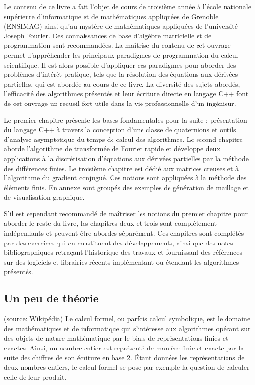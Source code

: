 Le contenu de ce livre a fait l'objet de cours de troisième année à l'école nationale supérieure d'informatique et de mathématiques appliquées de Grenoble (ENSIMAG) ainsi qu'au mystère de mathématiques appliquées de l'université Joseph Fourier. Des connaissances de base d'algèbre matricielle et de programmation sont recommandées. La maîtrise du contenu de cet ouvrage permet d'appréhender les principaux paradigmes de programmation du calcul scientifique. Il est alors possible d'appliquer ces paradigmes pour aborder des problèmes d'intérêt pratique, tels que la résolution des équations aux dérivées partielles, qui est abordée au cours de ce livre. La diversité des sujets abordés, l'efficacité des algorithmes présentés et leur écriture directe en langage C++ font de cet ouvrage un recueil fort utile dans la vie professionnelle d'un ingénieur. 

Le premier chapitre présente les bases fondamentales pour la suite : présentation du langage C++ à travers la conception d'une classe de quaternions et outils d'analyse asymptotique du temps de calcul des algorithmes. Le second chapitre aborde l'algorithme de transformée de Fourier rapide et développe deux applications à la discrétisation d'équations aux dérivées partielles par la méthode des différences finies. Le troisième chapitre est dédié aux matrices creuses et à l'algorithme du gradient conjugué. Ces notions sont appliquées à la méthode des éléments finis. En annexe sont groupés des exemples de génération de maillage et de visualisation graphique. 

S'il est cependant recommandé de maîtriser les notions du premier chapitre pour aborder le reste du livre, les chapitres deux et trois sont complètement indépendants et peuvent être abordés séparément. Ces chapitres sont complétés par des exercices qui en constituent des développements, ainsi que des notes bibliographiques retraçant l'historique des travaux et fournissant des références sur des logiciels et librairies récents implémentant ou étendant les algorithmes présentés. 

\subsection{Un peu de théorie}(source: Wikipédia)
Le calcul formel, ou parfois calcul symbolique, est le domaine des mathématiques et de informatique qui s'intéresse aux algorithmes opérant sur des objets de nature mathématique par le biais de représentations finies et exactes. Ainsi, un nombre entier est représenté de manière finie et exacte par la suite des chiffres de son écriture en base 2. Étant données les représentations de deux nombres entiers, le calcul formel se pose par exemple la question de calculer celle de leur produit.

